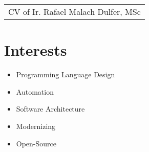 \documentclass[a4paper,12pt]{article}
\begin{document}
\pagestyle{empty} 



\begin{tabularx}{\linewidth}{@{} C @{}}
\Huge{CV of Ir. Rafael Malach Dulfer, MSc} \\[7.5pt]
\end{tabularx}


\section{Interests}
\begin{itemize}
\item Programming Language Design
\item Automation
\item Software Architecture
\item Modernizing
\item Open-Source
\end{itemize}
\end{document}
